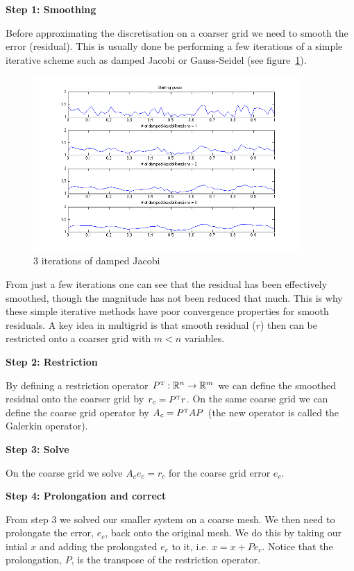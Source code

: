 \documentclass[11pt]{article}
\numberwithin{equation}{section}    %
\begin{document}
{\bf Step 1: Smoothing}

Before approximating the discretisation on a coarser grid we need to smooth the error (residual). This is usually done be performing a few iterations of a simple iterative scheme such as damped Jacobi or Gauss-Seidel  (see figure~\ref{fig:dampedjacobi}).
\begin{figure}[h!]
\centering
\includegraphics[width=4in]{dampedjacobi}
\caption{3 iterations of damped Jacobi}
\label{fig:dampedjacobi}
\end{figure}
From just a few iterations one can see that the residual has been effectively smoothed, though the magnitude has not been reduced that much. This is why these simple iterative methods have poor convergence properties for smooth residuals. A key idea in multigrid is that  smooth residual ($r$) then can be restricted onto a coarser grid with $m<n$ variables.

{\bf Step 2: Restriction}

By defining a restriction operator $P^{\mbox{\tiny{T}}}:\mathbb{R}^n \rightarrow \mathbb{R}^m$ we can define the smoothed residual onto the coarser grid by $r_c = P^{\mbox{\tiny{T}}}r$. On the same coarse grid we can define the coarse grid operator by $A_c = P^{\mbox{\tiny{T}}}AP$ (the new operator is called the Galerkin operator).

{\bf Step 3: Solve}

On the coarse grid we solve $A_ce_c = r_c$ for the coarse grid error $e_c$.


{\bf Step 4: Prolongation and correct}

From step 3 we solved our smaller system on a coarse mesh. We then need to prolongate the error, $e_c$, back onto the original mesh. We do this by taking our intial $x$ and adding the prolongated $e_c$ to it, i.e. $x = x+Pe_c$. Notice that the prolongation, $P$, is the transpose of the restriction operator.
\end{document}
